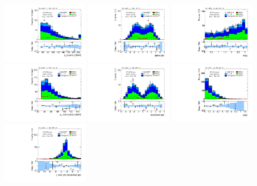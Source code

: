 \begin{figure}[tp]
  \includegraphics[width=0.32\textwidth]{figures/analysis/vbf-topCR/jet-1-pt}
  \includegraphics[width=0.32\textwidth]{figures/analysis/vbf-topCR/jet-1-eta}
  \includegraphics[width=0.32\textwidth]{figures/analysis/vbf-topCR/jets-dphi}
  \includegraphics[width=0.32\textwidth]{figures/analysis/vbf-topCR/jet-2-pt}
  \includegraphics[width=0.32\textwidth]{figures/analysis/vbf-topCR/jet-2-eta}
  \includegraphics[width=0.32\textwidth]{figures/analysis/vbf-topCR/jets-deta}
  \includegraphics[width=0.32\textwidth]{figures/analysis/vbf-topCR/jets-etaprod}

\end{figure}
